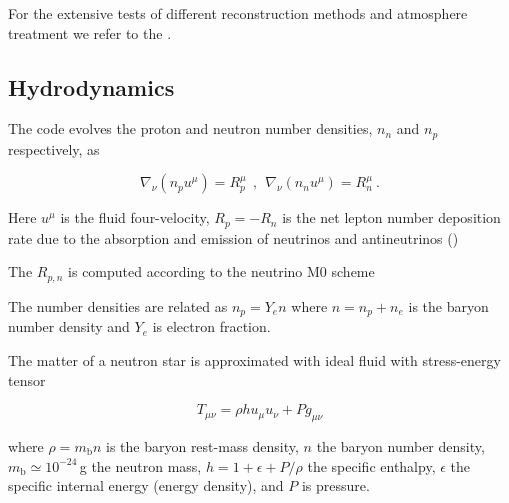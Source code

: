 For the extensive tests of different reconstruction methods and atmosphere treatment we refer to the \cite{Radice:2013apa}.


\subsection{Hydrodynamics}




The code evolves the proton and neutron number densities, $n_n$ and $n_p$
respectively, as 

\begin{equation}
\label{eq:wthc:pndens}
\nabla_\nu (n_p u^\mu) = R_p^\mu \ \ , \ \ 
\nabla_\nu (n_n u^\mu) = R_n^\mu \ .
\end{equation}



Here $u^{\mu}$ is the fluid four-velocity, $R_p = -R_n$ is the net
lepton number deposition rate due to the absorption and emission of neutrinos 
and antineutrinos (\red{see Section XXX})

The $R_{p,n}$ is computed according to the neutrino M0 scheme \cite{Radice:2016dwd,Radice:2018pdn}

The number densities are related as $n_p=Y_e n$ where $n = n_p + n_e$ is the baryon 
number density and $Y_e$ is electron fraction.

The matter of a neutron star is approximated with ideal fluid with stress-energy tensor

\begin{equation}
T_{\mu\nu} = \rho h u_{\mu} u_{\nu} + Pg_{\mu\nu}
\end{equation}

where $\rho=m_{\text{b}} n$ is the baryon rest-mass density, 
$n$ the baryon number density, $m_{\text{b}} \simeq 10^{-24}\,$g 
the neutron mass, 
$h=1+\epsilon + P/\rho$ the specific enthalpy, 
$\epsilon$ the specific internal energy (energy density),
and $P$ is  pressure.

